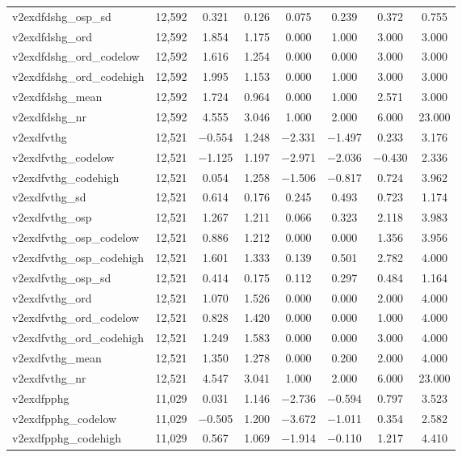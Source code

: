 \begin{table}[!htbp]
\begin{tabular}{@{\extracolsep{5pt}}lccccccc}
v2exdfdshg\_osp\_sd & 12,592 & 0.321 & 0.126 & 0.075 & 0.239 & 0.372 & 0.755 \\ 
v2exdfdshg\_ord & 12,592 & 1.854 & 1.175 & 0.000 & 1.000 & 3.000 & 3.000 \\ 
v2exdfdshg\_ord\_codelow & 12,592 & 1.616 & 1.254 & 0.000 & 0.000 & 3.000 & 3.000 \\ 
v2exdfdshg\_ord\_codehigh & 12,592 & 1.995 & 1.153 & 0.000 & 1.000 & 3.000 & 3.000 \\ 
v2exdfdshg\_mean & 12,592 & 1.724 & 0.964 & 0.000 & 1.000 & 2.571 & 3.000 \\ 
v2exdfdshg\_nr & 12,592 & 4.555 & 3.046 & 1.000 & 2.000 & 6.000 & 23.000 \\ 
v2exdfvthg & 12,521 & $-$0.554 & 1.248 & $-$2.331 & $-$1.497 & 0.233 & 3.176 \\ 
v2exdfvthg\_codelow & 12,521 & $-$1.125 & 1.197 & $-$2.971 & $-$2.036 & $-$0.430 & 2.336 \\ 
v2exdfvthg\_codehigh & 12,521 & 0.054 & 1.258 & $-$1.506 & $-$0.817 & 0.724 & 3.962 \\ 
v2exdfvthg\_sd & 12,521 & 0.614 & 0.176 & 0.245 & 0.493 & 0.723 & 1.174 \\ 
v2exdfvthg\_osp & 12,521 & 1.267 & 1.211 & 0.066 & 0.323 & 2.118 & 3.983 \\ 
v2exdfvthg\_osp\_codelow & 12,521 & 0.886 & 1.212 & 0.000 & 0.000 & 1.356 & 3.956 \\ 
v2exdfvthg\_osp\_codehigh & 12,521 & 1.601 & 1.333 & 0.139 & 0.501 & 2.782 & 4.000 \\ 
v2exdfvthg\_osp\_sd & 12,521 & 0.414 & 0.175 & 0.112 & 0.297 & 0.484 & 1.164 \\ 
v2exdfvthg\_ord & 12,521 & 1.070 & 1.526 & 0.000 & 0.000 & 2.000 & 4.000 \\ 
v2exdfvthg\_ord\_codelow & 12,521 & 0.828 & 1.420 & 0.000 & 0.000 & 1.000 & 4.000 \\ 
v2exdfvthg\_ord\_codehigh & 12,521 & 1.249 & 1.583 & 0.000 & 0.000 & 3.000 & 4.000 \\ 
v2exdfvthg\_mean & 12,521 & 1.350 & 1.278 & 0.000 & 0.200 & 2.000 & 4.000 \\ 
v2exdfvthg\_nr & 12,521 & 4.547 & 3.041 & 1.000 & 2.000 & 6.000 & 23.000 \\ 
v2exdfpphg & 11,029 & 0.031 & 1.146 & $-$2.736 & $-$0.594 & 0.797 & 3.523 \\ 
v2exdfpphg\_codelow & 11,029 & $-$0.505 & 1.200 & $-$3.672 & $-$1.011 & 0.354 & 2.582 \\ 
v2exdfpphg\_codehigh & 11,029 & 0.567 & 1.069 & $-$1.914 & $-$0.110 & 1.217 & 4.410 \\ 

\end{tabular}
\end{table}
